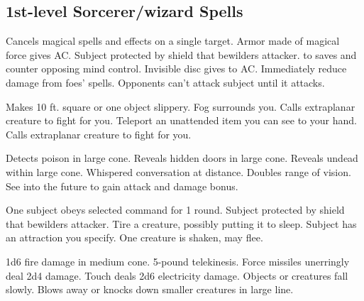 \subsection{1st-level Sorcerer/wizard Spells}
\begin{swspelllist}
   Cancels magical spells and effects on a single target.
   Armor made of magical force gives  AC.
   Subject protected by shield that bewilders attacker.
    to saves and counter opposing mind control.
   Invisible disc gives  to AC.
   Immediately reduce damage from foes' spells.
   Opponents can't attack subject until it attacks.

   Makes 10 ft. square or one object slippery.
   Fog surrounds you.
   Calls extraplanar creature to fight for you.
   Teleport an unattended item you can see to your hand.
   Calls extraplanar creature to fight for you.

   Detects poison in large cone.
   Reveals hidden doors in large cone.
   Reveals undead within large cone.
   Whispered conversation at distance.
   Doubles range of vision.
   See into the future to gain attack and damage bonus.

   One subject obeys selected command for 1 round.
   Subject protected by shield that bewilders attacker.
   Tire a creature, possibly putting it to sleep.
   Subject has an attraction you specify.
   One creature is shaken, may flee.

   1d6 fire damage in medium cone.
   5-pound telekinesis.
   Force missiles unerringly deal 2d4 damage.
   Touch deals 2d6 electricity damage.
   Objects or creatures fall slowly.
   Blows away or knocks down smaller creatures in large line.


\end{swspelllist}
